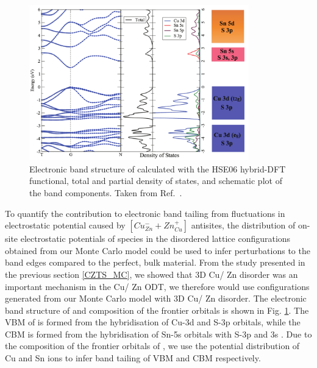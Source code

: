 \documentclass[11pt, twoside]{report}
\begin{document}
\begin{figure}[h!]
  \centering
    \includegraphics[width=0.85\textwidth]{figures/CZTS_band_structure.png}
    \caption[Electronic band structure of {\CZTS} calculated with the HSE06 hybrid-DFT functional, total and partial density of states, and schematic plot of the band components.]{Electronic band structure of {\CZTS} calculated with the HSE06 hybrid-DFT functional, total and partial density of states, and schematic plot of the band components. Taken from Ref.~.}
  \label{CZTS_band_structure}
\end{figure}

To quantify the contribution to electronic band tailing from fluctuations in electrostatic potential caused by $[Cu_{Zn}^{-} + Zn_{Cu}^{+}]$ antisites, the distribution of on-site electrostatic potentials of species in the disordered lattice configurations obtained from our Monte Carlo model could be used to infer perturbations to the band edges compared to the perfect, bulk material. From the study presented in the previous section \ref{CZTS_MC}, we showed that 3D Cu/ Zn disorder was an important mechanism in the Cu/ Zn ODT, we therefore would use configurations generated from our Monte Carlo model with 3D Cu/ Zn disorder. The electronic band structure of {\CZTS} and composition of the frontier orbitals is shown in Fig. \ref{CZTS_band_structure}. 
The VBM of {\CZTS} is formed from the hybridisation of Cu-3d and S-3p orbitals, while the CBM is formed from the hybridisation of Sn-5s orbitals with S-3p and 3s \cite{defects_Chen_large}. Due to the composition of the frontier orbitals of {\CZTS}, we use the potential distribution of Cu and Sn ions to infer band tailing of VBM and CBM respectively.
\end{document}
